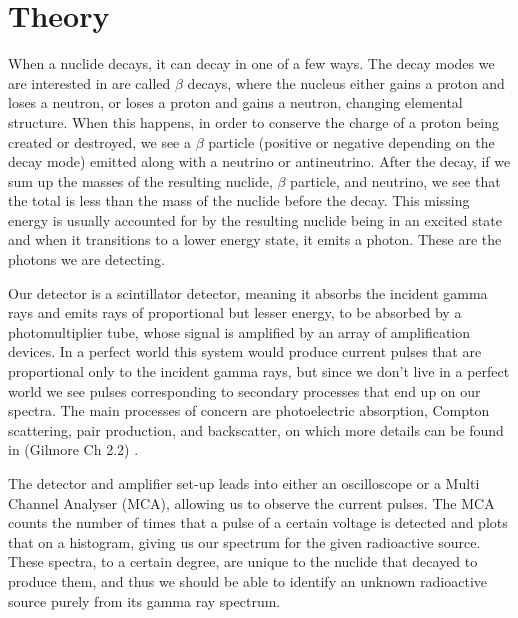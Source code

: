 \documentclass[11pt]{article}
\numberwithin{equation}{section}
\numberwithin{figure}{section}
\numberwithin{table}{section}
\begin{document}
    \section{Theory}\label{sec:Theory}
    \par When a nuclide decays, it can decay in one of a few ways. The decay modes we are interested in are called $\beta$ decays, where the nucleus either gains a proton and loses a neutron, or loses a proton and gains a neutron, changing elemental structure. When this happens, in order to conserve the charge of a proton being created or destroyed, we see a $\beta$ particle (positive or negative depending on the decay mode) emitted along with a neutrino or antineutrino. After the decay, if we sum up the masses of the resulting nuclide, $\beta$ particle, and neutrino, we see that the total is less than the mass of the nuclide before the decay. This missing energy is usually accounted for by the resulting nuclide being in an excited state and when it transitions to a lower energy state, it emits a photon. These are the photons we are detecting.
    \par Our detector is a scintillator detector, meaning it absorbs the incident gamma rays and emits rays of proportional but lesser energy, to be absorbed by a photomultiplier tube, whose signal is amplified by an array of amplification devices. In a perfect world this system would produce current pulses that are proportional only to the incident gamma rays, but since we don't live in a perfect world we see pulses corresponding to secondary processes that end up on our spectra. The main processes of concern are photoelectric absorption, Compton scattering, pair production, and backscatter, on which more details can be found in (Gilmore Ch 2.2) \cite{gilmore}. 
    \par The detector and amplifier set-up leads into either an oscilloscope or a Multi Channel Analyser (MCA), allowing us to observe the current pulses. The MCA counts the number of times that a pulse of a certain voltage is detected and plots that on a histogram, giving us our  spectrum for the given radioactive source. These spectra, to a certain degree, are unique to the nuclide that decayed to produce them, and thus we should be able to identify an unknown radioactive source purely from its gamma ray spectrum.
\end{document}
